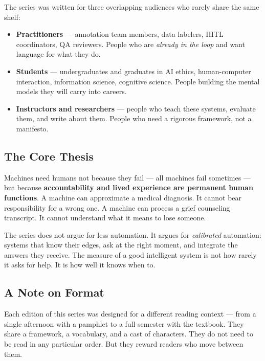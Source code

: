 \documentclass[12pt, a4paper]{article}
\begin{document}
The series was written for three overlapping audiences who rarely share the same shelf:

\begin{itemize}
  \item \textbf{Practitioners} — annotation team members, data labelers, HITL coordinators, QA reviewers. People who are \textit{already in the loop} and want language for what they do.
  \item \textbf{Students} — undergraduates and graduates in AI ethics, human-computer interaction, information science, cognitive science. People building the mental models they will carry into careers.
  \item \textbf{Instructors and researchers} — people who teach these systems, evaluate them, and write about them. People who need a rigorous framework, not a manifesto.
\end{itemize}

\subsection{The Core Thesis}

Machines need humans not because they fail — all machines fail sometimes — but because \textbf{accountability and lived experience are permanent human functions}. A machine can approximate a medical diagnosis. It cannot bear responsibility for a wrong one. A machine can process a grief counseling transcript. It cannot understand what it means to lose someone.

The series does not argue for less automation. It argues for \textit{calibrated} automation: systems that know their edges, ask at the right moment, and integrate the answers they receive. The measure of a good intelligent system is not how rarely it asks for help. It is how well it knows when to.

\subsection{A Note on Format}

Each edition of this series was designed for a different reading context — from a single afternoon with a pamphlet to a full semester with the textbook. They share a framework, a vocabulary, and a cast of characters. They do not need to be read in any particular order. But they reward readers who move between them.

\newpage

\end{document}
